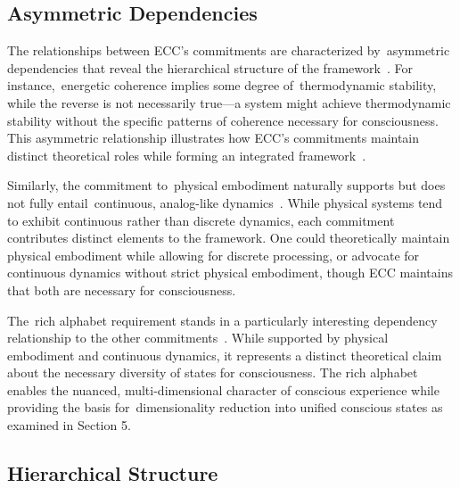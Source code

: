\subsection*{Asymmetric Dependencies}

The relationships between ECC's commitments are characterized by~asymmetric dependencies that reveal the hierarchical structure of the framework~\cite{mossio2015biological,difrisco2014hylomorphism}. For instance,~energetic coherence implies some degree of~thermodynamic stability, while the reverse is not necessarily true—a system might achieve thermodynamic stability without the specific patterns of coherence necessary for consciousness. This asymmetric relationship illustrates how ECC's commitments maintain distinct theoretical roles while forming an integrated framework~\cite{prigogine2018order,levin2020revisiting}.

Similarly, the commitment to~physical embodiment naturally supports but does not fully entail~continuous, analog-like dynamics~\cite{gallagher2005how,varela1996neurophenomenology}. While physical systems tend to exhibit continuous rather than discrete dynamics, each commitment contributes distinct elements to the framework. One could theoretically maintain physical embodiment while allowing for discrete processing, or advocate for continuous dynamics without strict physical embodiment, though ECC maintains that both are necessary for consciousness.

The~rich alphabet requirement stands in a particularly interesting dependency relationship to the other commitments~\cite{levin2019computational,gershman2023molecular}. While supported by physical embodiment and continuous dynamics, it represents a distinct theoretical claim about the necessary diversity of states for consciousness. The rich alphabet enables the nuanced, multi-dimensional character of conscious experience while providing the basis for~dimensionality reduction into unified conscious states as examined in Section 5.

\subsection*{Hierarchical Structure}


